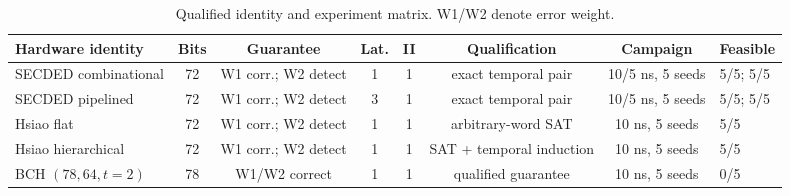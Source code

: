 \begin{table}[t]
\caption{Qualified identity and experiment matrix. W1/W2 denote error weight.}
\label{tab:matrix}
\centering\scriptsize\setlength{\tabcolsep}{3.4pt}
\begin{tabular}{@{}lccccccl@{}}
\toprule
Hardware identity & Bits & Guarantee & Lat. & II & Qualification & Campaign & Feasible \\
\midrule
SECDED combinational & 72 & W1 corr.; W2 detect & 1 & 1 & exact temporal pair & 10/5 ns, 5 seeds & 5/5; 5/5 \\
SECDED pipelined & 72 & W1 corr.; W2 detect & 3 & 1 & exact temporal pair & 10/5 ns, 5 seeds & 5/5; 5/5 \\
Hsiao flat & 72 & W1 corr.; W2 detect & 1 & 1 & arbitrary-word SAT & 10 ns, 5 seeds & 5/5 \\
Hsiao hierarchical & 72 & W1 corr.; W2 detect & 1 & 1 & SAT + temporal induction & 10 ns, 5 seeds & 5/5 \\
BCH $(78,64,t=2)$ & 78 & W1/W2 correct & 1 & 1 & qualified guarantee & 10 ns, 5 seeds & 0/5 \\
\bottomrule
\end{tabular}
\end{table}
